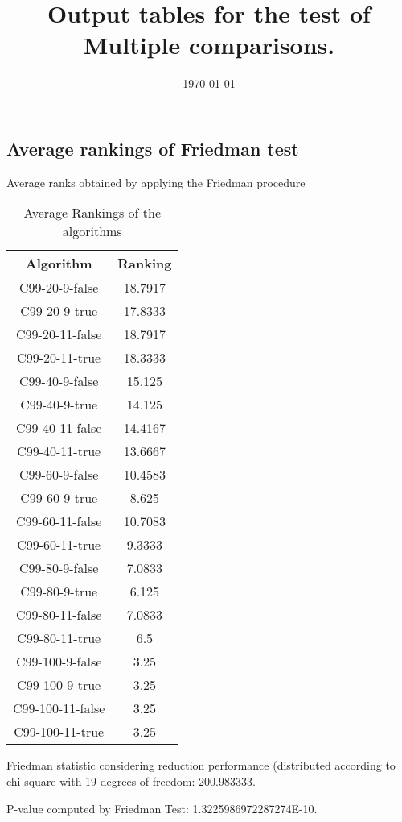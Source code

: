 \documentclass[a4paper,10pt]{article}
\title{Output tables for the test of Multiple comparisons.}
\author{}
\date{\today}
\begin{document}
\begin{landscape}
\pagestyle{empty}
\maketitle
\thispagestyle{empty}
\section{Average rankings of Friedman test}



Average ranks obtained by applying the Friedman procedure

\begin{table}[!htp]
\centering
\begin{tabular}{|c|c|}\hline
Algorithm&Ranking\\\hline
C99-20-9-false & 18.7917\\
C99-20-9-true & 17.8333\\
C99-20-11-false & 18.7917\\
C99-20-11-true & 18.3333\\
C99-40-9-false & 15.125\\
C99-40-9-true & 14.125\\
C99-40-11-false & 14.4167\\
C99-40-11-true & 13.6667\\
C99-60-9-false & 10.4583\\
C99-60-9-true & 8.625\\
C99-60-11-false & 10.7083\\
C99-60-11-true & 9.3333\\
C99-80-9-false & 7.0833\\
C99-80-9-true & 6.125\\
C99-80-11-false & 7.0833\\
C99-80-11-true & 6.5\\
C99-100-9-false & 3.25\\
C99-100-9-true & 3.25\\
C99-100-11-false & 3.25\\
C99-100-11-true & 3.25\\
\hline
\end{tabular}
\caption{Average Rankings of the algorithms}
\end{table}

Friedman statistic considering reduction performance (distributed according to chi-square with 19 degrees of freedom: 200.983333.

P-value computed by Friedman Test: 1.3225986972287274E-10.\newline




\end{landscape}
\end{document}
